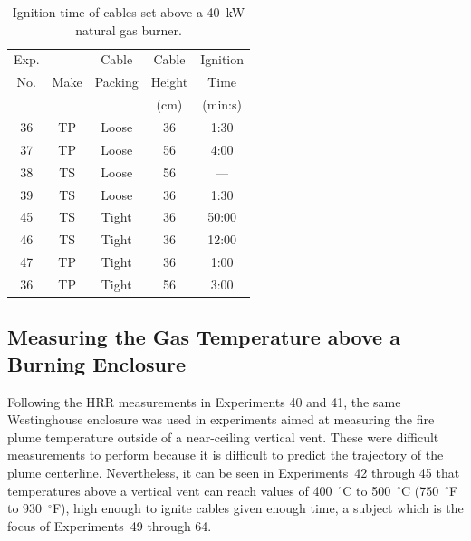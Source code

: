 \begin{table}[ht]
\begin{center}
\caption[Results of cable tray ignition experiments]{Ignition time of cables set above a 40~kW natural gas burner.}
\label{matrix2}
\begin{tabular}{|c|c|c|c|c|}
\hline
Exp.   &          & Cable             & Cable         & Ignition         \\
No.    & Make     & Packing           & Height        & Time             \\
       &          &                   & (cm)          & (min:s)          \\ \hline
36     & TP       & Loose             & 36            & 1:30             \\ \hline
37     & TP       & Loose             & 56            & 4:00             \\ \hline
38     & TS       & Loose             & 56            & ---              \\ \hline
39     & TS       & Loose             & 36            & 1:30             \\ \hline
45     & TS       & Tight             & 36            & 50:00            \\ \hline
46     & TS       & Tight             & 36            & 12:00            \\ \hline
47     & TP       & Tight             & 36            & 1:00             \\ \hline
36     & TP       & Tight             & 56            & 3:00             \\ \hline

\end{tabular}
\end{center}
\end{table}



\clearpage

\subsection{Measuring the Gas Temperature above a Burning Enclosure}

Following the HRR measurements in Experiments 40 and 41, the same Westinghouse enclosure was used in experiments aimed at measuring the fire plume temperature outside of a near-ceiling vertical vent. These were difficult measurements to perform because it is difficult to predict the trajectory of the plume centerline. Nevertheless, it can be seen in Experiments~42 through 45 that temperatures above a vertical vent can reach values of 400~$^\circ$C to 500~$^\circ$C (750~$^\circ$F to 930~$^\circ$F), high enough to ignite cables given enough time, a subject which is the focus of Experiments~49 through 64.



